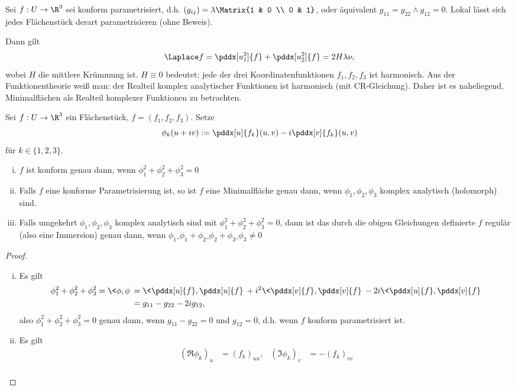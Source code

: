 Sei $f: U \to \R^3$ sei konform parametrisiert, d.h. $(g_{ij}) = \lambda \Matrix{1 & 0 \\ 0 & 1}$, oder äquivalent $g_{11} = g_{22} \land g_{12} = 0$.
Lokal lässt sich jedes Flächenstück derart parametrisieren (ohne Beweis).

Dann gilt
\[
	\Laplace f = \pddx[u_1^2]{f} + \pddx[u_2^2]{f} = 2 H \lambda \nu,
\]
wobei $H$ die mittlere Krümmung ist.
$H \equiv 0$ bedeutet: jede der drei Koordinatenfunktionen $f_1, f_2, f_3$ ist harmonisch.
Aus der Funktionentheorie weiß man:
der Realteil komplex analytischer Funktionen ist harmonisch (mit CR-Gleichung).
Daher ist es naheliegend, Minimalflächen als Realteil komplexer Funktionen zu betrachten.

\begin{st}
	Sei $f: U \to \R^3$ ein Flächenstück, $f = (f_1, f_2, f_3)$.
	Setze
	\[
		\phi_k(u + iv) := \pddx[u]{f_k}(u,v) - i \pddx[v]{f_k}(u,v)
	\]
	für $k \in \{1, 2, 3\}$.
	\begin{enumerate}[(i)]
		\item
			$f$ ist konform genau dann, wenn $\phi_1^2 + \phi_2^2 + \phi_3^2 = 0$
		\item
			Falls $f$ eine konforme Parametrisierung ist, so ist $f$ eine Minimalfläche genau dann, wenn $\phi_1, \phi_2, \phi_3$ komplex analytisch (holomorph) sind.
		\item
			Falls umgekehrt $\phi_1, \phi_2, \phi_3$ komplex analytisch sind mit $\phi_1^2 + \phi_2^2 + \phi_3^2 = 0$, dann ist das durch die obigen Gleichungen definierte $f$ regulär (also eine Immersion) genau dann, wenn $\phi_1\_\phi_1 + \phi_2\_\phi_2 + \phi_3\_\phi_3 \neq 0$
	\end{enumerate}
	\begin{proof}
		\begin{enumerate}[(i)]
			\item
				Es gilt
				\begin{align*}
					\phi_1^2 + \phi_2^2 + \phi_3^2
					= \< \phi, \phi \>
					&= \< \pddx[u]{f}, \pddx[u]{f} \> + i^2 \<\pddx[v]{f}, \pddx[v]{f}\> - 2i \< \pddx[u]{f}, \pddx[v]{f} \> \\
					&= g_{11} - g_{22} - 2i g_{12},
				\end{align*}
				also $\phi_1^2 + \phi_2^2 + \phi_3^2 = 0$ genau dann, wenn $g_{11} - g_{22} = 0$ und $g_{12} = 0$, d.h. wenn $f$ konform parametrisiert ist.
			\item
				Es gilt
				\begin{align*}
					(\Re \phi_k)_u &= (f_k)_{uu}, & (\Im \phi_k)_v &= - (f_k)_{vv} \\

\end{align*}
\end{enumerate}
\end{proof}
\end{st}
